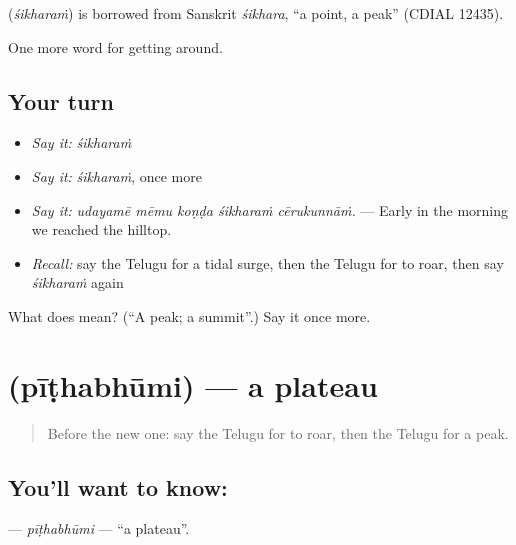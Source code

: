 \begin{cousinweb}
\textbf{} (\emph{śikharaṁ}) is borrowed from Sanskrit \emph{śikhara}, \textquotedblleft{}a point, a peak\textquotedblright{} (CDIAL 12435).
\end{cousinweb}

\begin{grammarlens}[title={What you've built}]
One more word for getting around.
\end{grammarlens}

\subsection*{Your turn}
\begin{itemize}
\raggedright
  \item \emph{Say it:} \emph{śikharaṁ}
  \item \emph{Say it:} \emph{śikharaṁ}, once more
  \item \emph{Say it:} \emph{udayamē mēmu koṇḍa śikharaṁ cērukunnāṁ.} — Early in the morning we reached the hilltop.
  \item \emph{Recall:} say the Telugu for a tidal surge, then the Telugu for to roar, then say \emph{śikharaṁ} again
\end{itemize}

\begin{tcolorbox}[breakable,colback=teal!4,colframe=teal!35!black,title={Before you move on}]
What does  mean? (\textquotedblleft{}A peak; a summit\textquotedblright{}.) Say it once more.
\end{tcolorbox}
\section[\texorpdfstring{\te{పీఠభూమి} (pīṭhabhūmi)}{పీఠభూమి (pīṭhabhūmi)}]{ (pīṭhabhūmi) — a plateau}

\label{lesson:TE-C474-pithabhumi}



\begin{quote}
Before the new one: say the Telugu for to roar, then the Telugu for a peak.
\end{quote}

\subsection*{You'll want to know: }
\textbf{} — \emph{pīṭhabhūmi} — \textquotedblleft{}a plateau\textquotedblright{}.

